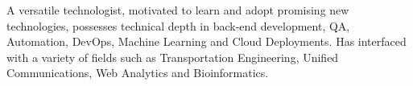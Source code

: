 

\begin{cvparagraph}

A versatile technologist, motivated to learn and adopt promising new technologies,
possesses technical depth in back-end development, QA, Automation, DevOps,
Machine Learning and Cloud Deployments.
Has interfaced with a variety of fields such as Transportation Engineering,
Unified Communications, Web Analytics and Bioinformatics.

\end{cvparagraph}
